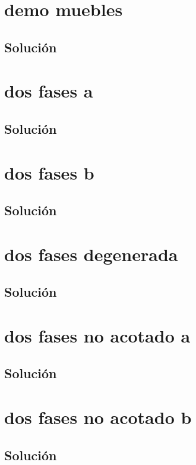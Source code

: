 \documentclass[a4paper,10pt,onecolumn]{report}
\begin{document}
\section{demo muebles}

\subsection*{Solución}

\clearpage
\section{dos fases a}

\subsection*{Solución}

\clearpage
\section{dos fases b}

\subsection*{Solución}

\clearpage
\section{dos fases degenerada}

\subsection*{Solución}

\clearpage
\section{dos fases no acotado a}

\subsection*{Solución}

\clearpage
\section{dos fases no acotado b}

\subsection*{Solución}

\clearpage
\end{document}

